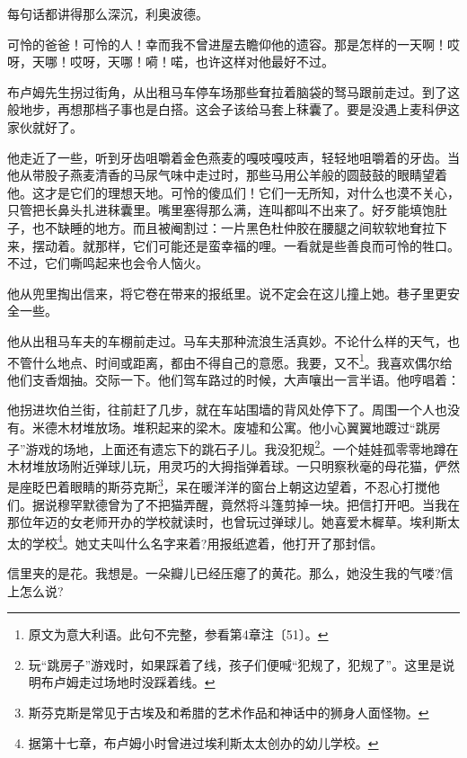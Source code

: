 \par 每句话都讲得那么深沉，利奥波德。
\par 可怜的爸爸！可怜的人！幸而我不曾进屋去瞻仰他的遗容。那是怎样的一天啊！哎呀，天哪！哎呀，天哪！嗬！喏，也许这样对他最好不过。
\par 布卢姆先生拐过街角，从出租马车停车场那些耷拉着脑袋的驽马跟前走过。到了这般地步，再想那档子事也是白搭。这会子该给马套上秣囊了。要是没遇上麦科伊这家伙就好了。
\par 他走近了一些，听到牙齿咀嚼着金色燕麦的嘎吱嘎吱声，轻轻地咀嚼着的牙齿。当他从带股子燕麦清香的马尿气味中走过时，那些马用公羊般的圆鼓鼓的眼睛望着他。这才是它们的理想天地。可怜的傻瓜们！它们一无所知，对什么也漠不关心，只管把长鼻头扎进秣囊里。嘴里塞得那么满，连叫都叫不出来了。好歹能填饱肚子，也不缺睡的地方。而且被阉割过：一片黑色杜仲胶在腰腿之间软软地耷拉下来，摆动着。就那样，它们可能还是蛮幸福的哩。一看就是些善良而可怜的牲口。不过，它们嘶鸣起来也会令人恼火。
\par 他从兜里掏出信来，将它卷在带来的报纸里。说不定会在这儿撞上她。巷子里更安全一些。
\par 他从出租马车夫的车棚前走过。马车夫那种流浪生活真妙。不论什么样的天气，也不管什么地点、时间或距离，都由不得自己的意愿。我要，又不\footnote{原文为意大利语。此句不完整，参看第4章注〔51〕。}。我喜欢偶尔给他们支香烟抽。交际一下。他们驾车路过的时候，大声嚷出一言半语。他哼唱着：
\par 他拐进坎伯兰街，往前赶了几步，就在车站围墙的背风处停下了。周围一个人也没有。米德木材堆放场。堆积起来的梁木。废墟和公寓。他小心翼翼地踱过“跳房子”游戏的场地，上面还有遗忘下的跳石子儿。我没犯规\footnote{玩“跳房子”游戏时，如果踩着了线，孩子们便喊“犯规了，犯规了”。这里是说明布卢姆走过场地时没踩着线。}。一个娃娃孤零零地蹲在木材堆放场附近弹球儿玩，用灵巧的大拇指弹着球。一只明察秋毫的母花猫，俨然是座眨巴着眼睛的斯芬克斯\footnote{斯芬克斯是常见于古埃及和希腊的艺术作品和神话中的狮身人面怪物。}，呆在暖洋洋的窗台上朝这边望着，不忍心打搅他们。据说穆罕默德曾为了不把猫弄醒，竟然将斗篷剪掉一块。把信打开吧。当我在那位年迈的女老师开办的学校就读时，也曾玩过弹球儿。她喜爱木樨草。埃利斯太太的学校\footnote{据第十七章，布卢姆小时曾进过埃利斯太太创办的幼儿学校。}。她丈夫叫什么名字来着?用报纸遮着，他打开了那封信。
\par 信里夹的是花。我想是。一朵瓣儿已经压瘪了的黄花。那么，她没生我的气喽?信上怎么说?
